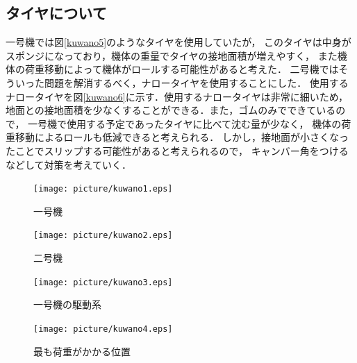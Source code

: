 \documentclass[11pt,a4j]{jarticle}
\begin{document}
\subsection{タイヤについて}
一号機では図\ref{kuwano5}のようなタイヤを使用していたが，
このタイヤは中身がスポンジになっており，機体の重量でタイヤの接地面積が増えやすく，
また機体の荷重移動によって機体がロールする可能性があると考えた．
二号機ではそういった問題を解消するべく，ナロータイヤを使用することにした．
使用するナロータイヤを図\ref{kuwano6}に示す．使用するナロータイヤは非常に細いため，
地面との接地面積を少なくすることができる．また，ゴムのみでできているので，
一号機で使用する予定であったタイヤに比べて沈む量が少なく，
機体の荷重移動によるロールも低減できると考えられる．
しかし，接地面が小さくなったことでスリップする可能性があると考えられるので，
キャンバー角をつけるなどして対策を考えていく．

\begin{figure}[t]
  \begin{center}
    \texttt{[image: picture/kuwano1.eps]}
    \caption{一号機}
    \label{kuwano1}
  \end{center}
\end{figure}

\begin{figure}[t]
  \begin{center}
    \texttt{[image: picture/kuwano2.eps]}
    \caption{二号機}
    \label{kuwano2}
  \end{center}
\end{figure}

\begin{figure}[t]
  \begin{center}
    \texttt{[image: picture/kuwano3.eps]}
    \caption{一号機の駆動系}
    \label{kuwano3}
  \end{center}
\end{figure}

\begin{figure}[t]
  \begin{center}
    \texttt{[image: picture/kuwano4.eps]}
    \caption{最も荷重がかかる位置}
    \label{kuwano4}
  \end{center}
\end{figure}
\end{document}
